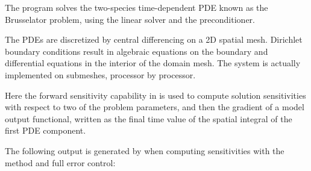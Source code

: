 The  program solves the two-species time-dependent
PDE known as the Brusselator problem, using the {\idaspgmr} linear solver and the
{\idabbdpre} preconditioner.

The PDEs are discretized by central differencing on a 2D spatial mesh.
Dirichlet boundary conditions result in  algebraic equations on the boundary 
and differential equations in the interior of the domain mesh.
The system is actually implemented on submeshes, processor by processor.

Here the forward sensitivity capability in {\idas} is used to compute solution
sensitivities with respect to two of the problem parameters, and then the gradient
of a model output functional, written as the final time value of the spatial integral
of the first PDE component.

The following output is generated by  when computing
sensitivities with the  method and full error control:


